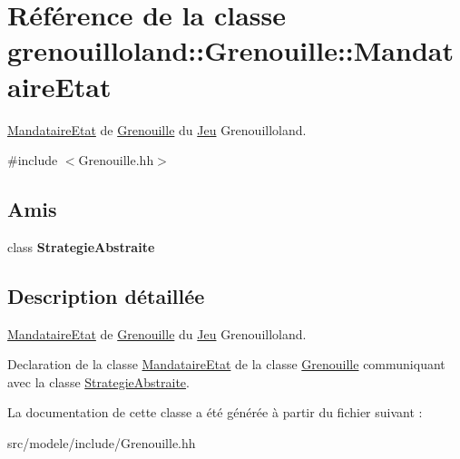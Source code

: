\hypertarget{classgrenouilloland_1_1Grenouille_1_1MandataireEtat}{\section{Référence de la classe grenouilloland\-:\-:Grenouille\-:\-:Mandataire\-Etat}
\label{classgrenouilloland_1_1Grenouille_1_1MandataireEtat}
}


\hyperlink{classgrenouilloland_1_1Grenouille_1_1MandataireEtat}{Mandataire\-Etat} de \hyperlink{classgrenouilloland_1_1Grenouille}{Grenouille} du \hyperlink{classgrenouilloland_1_1Jeu}{Jeu} Grenouilloland.  




{\ttfamily \#include $<$Grenouille.\-hh$>$}

\subsection*{Amis}
\begin{DoxyCompactItemize}
\item 
\hypertarget{classgrenouilloland_1_1Grenouille_1_1MandataireEtat_a9a79032ff78e90ffabb6263df62d5ed6}{class {\bfseries Strategie\-Abstraite}}\label{classgrenouilloland_1_1Grenouille_1_1MandataireEtat_a9a79032ff78e90ffabb6263df62d5ed6}

\end{DoxyCompactItemize}


\subsection{Description détaillée}
\hyperlink{classgrenouilloland_1_1Grenouille_1_1MandataireEtat}{Mandataire\-Etat} de \hyperlink{classgrenouilloland_1_1Grenouille}{Grenouille} du \hyperlink{classgrenouilloland_1_1Jeu}{Jeu} Grenouilloland. 

Declaration de la classe \hyperlink{classgrenouilloland_1_1Grenouille_1_1MandataireEtat}{Mandataire\-Etat} de la classe \hyperlink{classgrenouilloland_1_1Grenouille}{Grenouille} communiquant avec la classe \hyperlink{classgrenouilloland_1_1StrategieAbstraite}{Strategie\-Abstraite}. 

La documentation de cette classe a été générée à partir du fichier suivant \-:\begin{DoxyCompactItemize}
\item 
src/modele/include/Grenouille.\-hh\end{DoxyCompactItemize}
